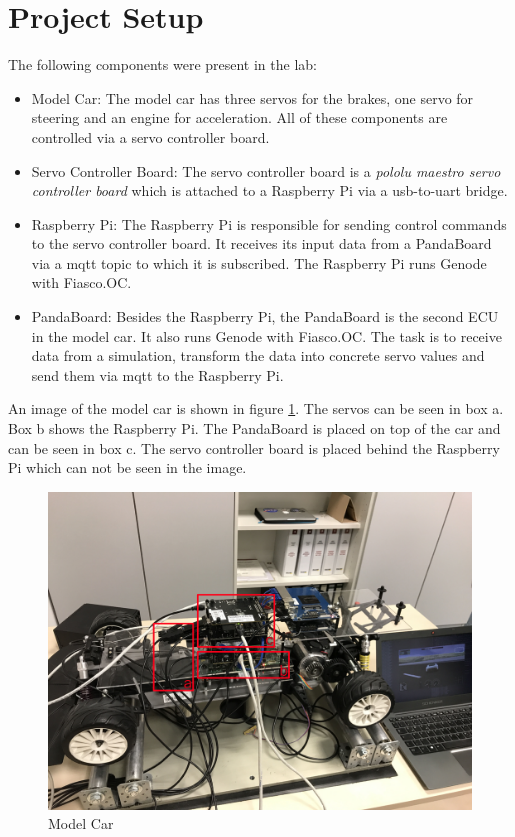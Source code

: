 \section{Project Setup}
The following components were present in the lab:

\begin{itemize}
    \item Model Car: The model car has three servos for the brakes, one servo for steering and an engine for acceleration. All of these components are controlled via a servo controller board.
   
    \item Servo Controller Board: The servo controller board is a \textit{pololu maestro servo controller board} which is attached to a Raspberry Pi via a usb-to-uart bridge.
   
    \item Raspberry Pi: The Raspberry Pi is responsible for sending control commands to the servo controller board. It receives its input data from a PandaBoard via a mqtt topic to which it is subscribed. The Raspberry Pi runs Genode with Fiasco.OC.
   
    \item PandaBoard: Besides the Raspberry Pi, the PandaBoard is the second ECU in the model car. It also runs Genode with Fiasco.OC. The task is to receive data from a simulation, transform the data into concrete servo values and send them via mqtt to the Raspberry Pi.
\end{itemize}

An image of the model car is shown in figure \ref{fig:model}. The servos can be seen in box a. Box b shows the Raspberry Pi. The PandaBoard is placed on top of the car and can be seen in box c. The servo controller board is placed behind the Raspberry Pi which can not be seen in the image. \\

\begin{figure}[h]
       \centering
       \includegraphics[width=1.0\linewidth]{images/model}
       \caption{Model Car}
       \label{fig:model}
\end{figure}

